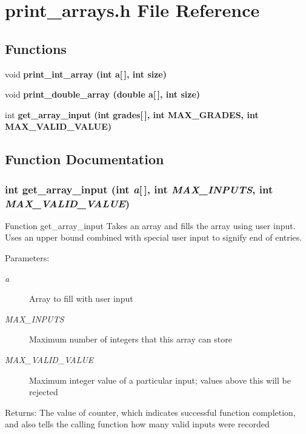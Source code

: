 \section{print\_\-arrays.h File Reference}
\label{print__arrays_8h}
\subsection*{Functions}
\begin{CompactItemize}
\item 
void \bf{print\_\-int\_\-array} (int a[$\,$], int size)
\item 
void \bf{print\_\-double\_\-array} (double a[$\,$], int size)
\item 
int \bf{get\_\-array\_\-input} (int grades[$\,$], int MAX\_\-GRADES, int MAX\_\-VALID\_\-VALUE)
\end{CompactItemize}


\subsection{Function Documentation}
\subsubsection{\setlength{\rightskip}{0pt plus 5cm}int get\_\-array\_\-input (int {\em a}[$\,$], int {\em MAX\_\-INPUTS}, int {\em MAX\_\-VALID\_\-VALUE})}\label{print__arrays_8h_6f3940493d688c32c7a18b0426e6c3ca}


Function get\_\-array\_\-input Takes an array and fills the array using user input. Uses an upper bound combined with special user input to signify end of entries.

\begin{Desc}
\item[Parameters:]
\begin{description}
\item[{\em a}]Array to fill with user input \item[{\em MAX\_\-INPUTS}]Maximum number of integers that this array can store \item[{\em MAX\_\-VALID\_\-VALUE}]Maximum integer value of a particular input; values above this will be rejected\end{description}
\end{Desc}
\begin{Desc}
\item[Returns:]The value of counter, which indicates successful function completion, and also tells the calling function how many valid inputs were recorded \end{Desc}
